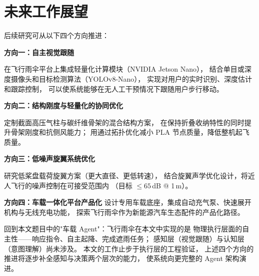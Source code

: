 \section{未来工作展望}

后续研究可从以下四个方向推进：

\textbf{方向一：自主视觉跟随}

在飞行雨伞平台上集成轻量化计算模块（NVIDIA Jetson Nano），
结合单目或深度摄像头和目标检测算法（YOLOv8-Nano），
实现对用户的实时识别、深度估计和跟踪控制，
可以使系统能够在无人工干预情况下跟随用户步行移动。

\textbf{方向二：结构刚度与轻量化的协同优化}

定制截面高压气柱与碳纤维骨架的混合结构方案，
在保持折叠收纳特性的同时提升骨架刚度和抗侧风能力；
用通过拓扑优化减小 PLA 节点质量，降低整机起飞质量。

\textbf{方向三：低噪声旋翼系统优化}

研究低桨盘载荷旋翼方案（更大直径、更低转速），
结合旋翼声学优化设计，将近人飞行的噪声控制在可接受范围内
（目标 $\leq 65$\,dB @ 1\,m）。

\textbf{方向四：车载一体化平台产品化}
设计专用车载底座，集成自动充气泵、快速展开机构与无线充电功能，
探索飞行雨伞作为新能源汽车生态配件的产品化路径。

\vspace{1em}
回到本文题目中的"车载 Agent"：飞行雨伞在本文中实现的是
物理执行层面的自主性——响应指令、自主起降、完成遮雨任务；
感知层（视觉跟随）与认知层（意图理解）尚未涉及。
本文的工作止步于执行层的工程验证，
上述四个方向的推进将逐步补全感知与决策两个层次的能力，
使系统向更完整的 Agent 架构演进。